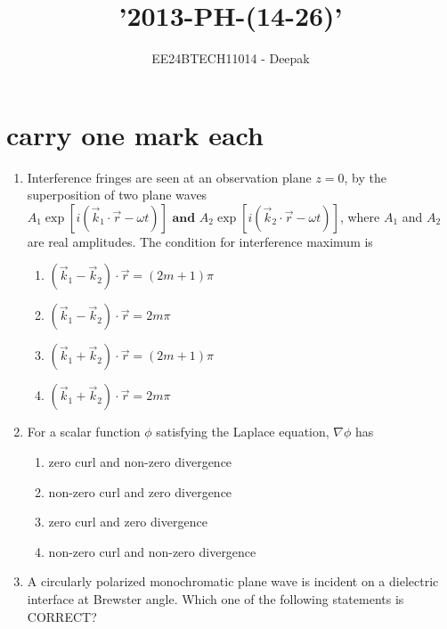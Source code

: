 \documentclass[journal]{IEEEtran}
\theoremstyle{remark}
\begin{document}

\onecolumn

\title{'2013-PH-(14-26)'}
\author{EE24BTECH11014 - Deepak }
\maketitle

\renewcommand{\thefigure}{\theenumi}
\renewcommand{\thetable}{\theenumi}

\section{carry one mark each}
\begin{enumerate}
    \item Interference fringes are seen at an observation plane $z=0$, by the superposition of two plane waves $
    A_1 \exp[i(\overrightarrow{k}_1 \cdot \overrightarrow{r} - \omega t)] 
  \textbf{ and }   A_2 \exp[i(\overrightarrow{k}_2 \cdot \overrightarrow{r} - \omega t)]$, where $A_1$ and $A_2$ are real amplitudes. The condition for interference maximum is 

  \begin{enumerate}
    \item $(\overrightarrow{k}_1 - \overrightarrow{k}_2) \cdot \overrightarrow{r} = (2m+1)\pi$
    \item $(\overrightarrow{k}_1 - \overrightarrow{k}_2) \cdot \overrightarrow{r} = 2m\pi$
    \item $(\overrightarrow{k}_1 + \overrightarrow{k}_2) \cdot \overrightarrow{r} = (2m+1)\pi$
    \item $(\overrightarrow{k}_1 + \overrightarrow{k}_2) \cdot \overrightarrow{r} = 2m\pi$
\end{enumerate}


\item For a scalar function $\phi$ satisfying the Laplace equation, $\nabla \phi$ has

\begin{enumerate}
    \item zero curl and non-zero divergence
    \item non-zero curl and zero divergence
    \item zero curl and zero divergence
    \item non-zero curl and non-zero divergence
\end{enumerate}

 \item A circularly polarized monochromatic plane wave is incident on a dielectric interface at Brewster angle. Which one of the following statements is CORRECT?


\end{enumerate}
\end{document}
